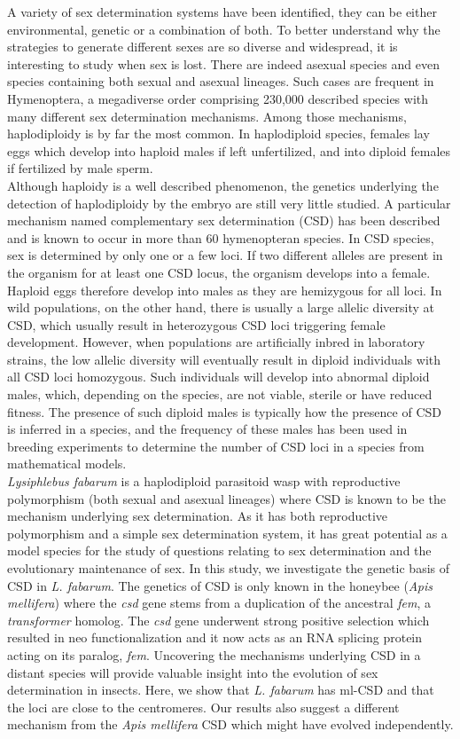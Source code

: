 \documentclass[11pt,a4paper]{report}
\begin{document}
A variety of sex determination systems have been identified, they can be either environmental, genetic or a combination of both. To better understand why the strategies to generate different sexes are so diverse and widespread, it is interesting to study when sex is lost. There are indeed asexual species and even species containing both sexual and asexual lineages. Such cases are frequent in Hymenoptera, a megadiverse order comprising 230,000 described species with many different sex determination mechanisms. Among those mechanisms, haplodiploidy is by far the most common. In haplodiploid species, females lay eggs which develop into haploid males if left unfertilized, and into diploid females if fertilized by male sperm. \\
Although haploidy is a well described phenomenon, the genetics underlying the detection of haplodiploidy by the embryo are still very little studied. A particular mechanism named complementary sex determination (CSD) has been described and is known to occur in more than 60 hymenopteran species. In CSD species, sex is determined by only one or a few loci. If two different alleles are present in the organism for at least one CSD locus, the organism develops into a female. Haploid eggs therefore develop into males as they are hemizygous for all loci. In wild populations, on the other hand, there is usually a large allelic diversity at CSD, which usually result in heterozygous CSD loci triggering female development. However, when populations are artificially inbred in laboratory strains, the low allelic diversity will eventually result in diploid individuals with all CSD loci homozygous. Such individuals will develop into abnormal diploid males, which, depending on the species, are not viable, sterile or have reduced fitness. The presence of such diploid males is typically how the presence of CSD is inferred in a species, and the frequency of these males has been used in breeding experiments to determine the number of CSD loci in a species from mathematical models.\\
\textit{Lysiphlebus fabarum} is a haplodiploid parasitoid wasp with reproductive polymorphism (both sexual and asexual lineages) where CSD is known to be the mechanism underlying sex determination. As it has both reproductive polymorphism and a simple sex determination system, it has great potential as a model species for the study of questions relating to sex determination and the evolutionary maintenance of sex. 
In this study, we investigate the genetic basis of CSD in \textit{L. fabarum}. The genetics of CSD is only known in the honeybee (\textit{Apis mellifera}) where the \textit{csd} gene stems from a duplication of the ancestral \textit{fem}, a \textit{transformer} homolog. The \textit{csd} gene underwent strong positive selection which resulted in neo functionalization and it now acts as an RNA splicing protein acting on its paralog, \textit{fem}. Uncovering the mechanisms underlying CSD in a distant species will provide valuable insight into the evolution of sex determination in insects. Here, we show that \textit{L. fabarum} has ml-CSD and that the loci are close to the centromeres. Our results also suggest a different mechanism from the \textit{Apis mellifera} CSD which might have evolved independently.
\end{document}
